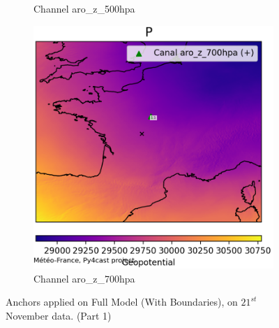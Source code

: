 \begin{figure}[h]
\begin{subfigure}[b]{0.49\textwidth}
        \caption{Channel aro\_z\_500hpa}
    \end{subfigure}
    \hfill
    \begin{subfigure}[b]{0.49\textwidth}
        \includegraphics[width=\textwidth]{Images/titan_rain_anchors/nov-21/complete-arp/2023112100_feature_aro_z_700hpa.png}
        \caption{Channel aro\_z\_700hpa}
    \end{subfigure}
    \caption{Anchors applied on Full Model (With Boundaries), on $21^{st}$ November data. (Part 1)}
    \label{fig:titan-full-arp-anchors-21}
\end{figure}
